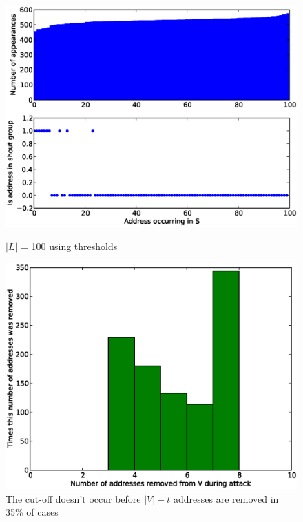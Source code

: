 \documentclass[ %
                    author={Luke Murray},
                supervisor={Dr. Simon Hollis},
                     title={Shadow Peer-to-Peer Networks},
                  subtitle={},
                    degree={MEng},
                      year={2013} ]{thesis}
\begin{document}
\begin{figure}[h]%
    \centering
    \begin{minipage}[b]{0.4\linewidth}
        \centering
        \includegraphics[width=\linewidth]{diagrams/threshold_attack1.eps}
        \caption{$|L|$ = 100 using thresholds}
        \label{threshold_attack1}
    \end{minipage}
    \hspace{0.5cm}
    \begin{minipage}[b]{0.4\linewidth}
        \centering
        \includegraphics[width=\linewidth]{diagrams/threshold_attack2.eps}
        \caption{The cut-off doesn't occur before $|V| - t$ addresses are removed in 35\% of cases}
        \label{threshold_attack2}
    \end{minipage}
\end{figure}
\end{document}
